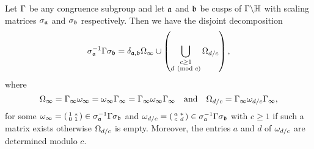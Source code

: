     \begin{theorem*}
      Let $\Gamma$ be any congruence subgroup and let $\mathfrak{a}$ and $\mathfrak{b}$ be cusps of $\Gamma\backslash\mathbb{H}$ with scaling matrices $\sigma_{\mathfrak{a}}$ and $\sigma_{\mathfrak{b}}$ respectively. Then we have the disjoint decomposition
      \[
        \sigma_{\mathfrak{a}}^{-1}\Gamma\sigma_{\mathfrak{b}} = \delta_{\mathfrak{a},\mathfrak{b}}\Omega_{\infty} \cup \left(\bigcup_{\substack{c \ge 1 \\ d \ (\mathrm{mod}\text{ }c)}}\Omega_{d/c}\right),
      \]
      where
      \[
        \Omega_{\infty} = \Gamma_{\infty}\omega_{\infty} = \omega_{\infty}\Gamma_{\infty} = \Gamma_{\infty}\omega_{\infty}\Gamma_{\infty} \quad \text{and} \quad \Omega_{d/c} = \Gamma_{\infty}\omega_{d/c}\Gamma_{\infty},
      \]
      for some $\omega_{\infty} = \begin{psmallmatrix} 1 & \ast \\ 0 & 1 \end{psmallmatrix} \in \sigma_{\mathfrak{a}}^{-1}\Gamma\sigma_{\mathfrak{b}}$ and $\omega_{d/c} = \begin{psmallmatrix} a & \ast \\ c & d \end{psmallmatrix} \in \sigma_{\mathfrak{a}}^{-1}\Gamma\sigma_{\mathfrak{b}}$ with $c \ge 1$ if such a matrix exists otherwise $\Omega_{d/c}$ is empty. Moreover, the entries $a$ and $d$ of $\omega_{d/c}$ are determined modulo $c$.
    \end{theorem*}
